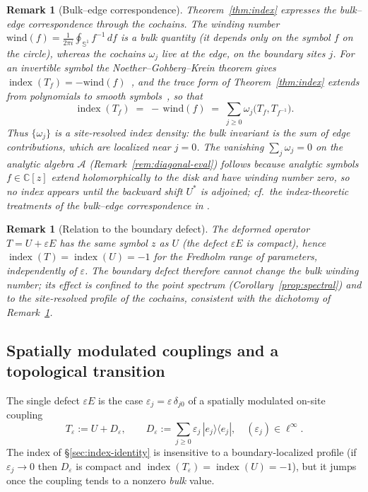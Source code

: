 \documentclass[10pt]{amsart}
\newcommand{\1}{{\mathbb{I}}}
\newcommand{\ind}{\operatorname{index}}
\newtheorem{remark}[theorem]{Remark}
\numberwithin{equation}{section}
\begin{document}
\begin{remark}[Bulk--edge correspondence]\label{rem:bulk-edge-index}
Theorem~\ref{thm:index} expresses the bulk--edge correspondence through the cochains. The winding number $\mathrm{wind}(f)=\frac{1}{2\pi i}\oint_{\mathbb{S}^1} f^{-1}\,df$ is a
\emph{bulk} quantity (it depends only on the symbol $f$ on the circle), whereas the cochains
$\omega_j$ live at the \emph{edge}, on the boundary sites $j$. For an invertible symbol the
Noether--Gohberg--Krein theorem gives $\ind(T_f)=-\mathrm{wind}(f)$~\cite{GK69,BotSil06},
and the trace form of Theorem~\ref{thm:index} extends from polynomials to smooth
symbols~\cite{HeltonHowe}, so that
\[
\ind(T_f)\;=\;-\,\mathrm{wind}(f)\;=\;\sum_{j\ge0}\omega_j\bigl(T_f,T_{f^{-1}}\bigr).
\]
Thus $\{\omega_j\}$ is a \emph{site-resolved index density}: the bulk invariant is the sum of
edge contributions, which are localized near $j=0$. The vanishing $\sum_j\omega_j=0$ on the
analytic algebra $\mathcal{A}$ (Remark~\ref{rem:diagonal-eval}) follows because analytic
symbols $f\in\mathbb{C}[z]$ extend holomorphically to the disk and have winding number zero, so
no index appears until the backward shift $U^*$ is adjoined; cf.\ the index-theoretic
treatments of the bulk--edge correspondence in \cite{AriciMesland,ProdanSchulzBaldes,Thiang,Kasparov80}.
\end{remark}

\begin{remark}[Relation to the boundary defect]\label{rem:defect-index}
The deformed operator $T=U+\varepsilon E$ has the same symbol $z$ as $U$ (the defect
$\varepsilon E$ is compact), hence $\ind(T)=\ind(U)=-1$ for the Fredholm
range of parameters, independently of $\varepsilon$. The boundary defect therefore cannot change
the bulk winding number; its effect is confined to the point spectrum
(Corollary~\ref{prop:spectral}) and to the site-resolved profile of the cochains, consistent
with the dichotomy of Remark~\ref{rem:bulk-edge-index}.
\end{remark}

\subsection{Spatially modulated couplings and a topological transition}
\label{sec:modulated}

The single defect $\varepsilon E$ is the case $\varepsilon_j=\varepsilon\,\delta_{j0}$ of a
spatially modulated on-site coupling
\[
T_\varepsilon := U + D_\varepsilon,\qquad
D_\varepsilon := \sum_{j\ge0}\varepsilon_j\,|e_j\rangle\langle e_j|,\quad (\varepsilon_j)\in\ell^\infty.
\]
The index of \S\ref{sec:index-identity} is insensitive to a boundary-localized profile (if
$\varepsilon_j\to0$ then $D_\varepsilon$ is compact and
$\ind(T_\varepsilon)=\ind(U)=-1$), but it jumps once the coupling tends to a
nonzero \emph{bulk} value.
\end{document}
